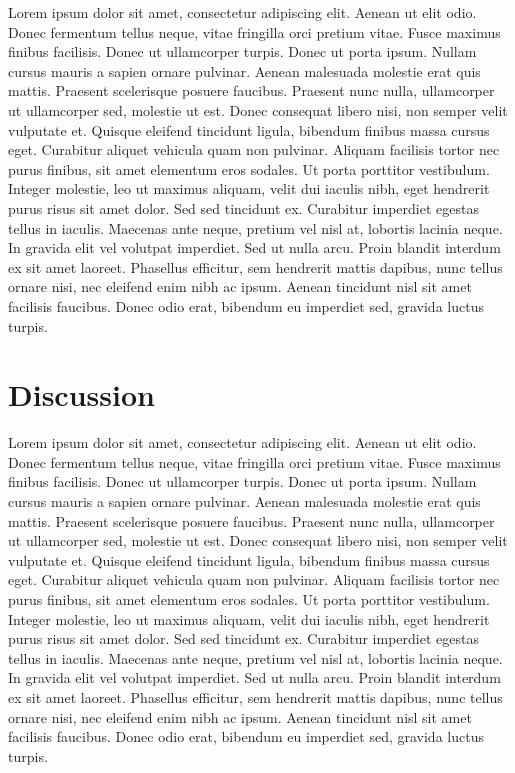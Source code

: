 \documentclass[utf8]{frontiersSCNS}
\begin{document}
Lorem ipsum dolor sit amet, consectetur adipiscing elit. Aenean ut elit
odio. Donec fermentum tellus neque, vitae fringilla orci pretium vitae.
Fusce maximus finibus facilisis. Donec ut ullamcorper turpis. Donec ut
porta ipsum. Nullam cursus mauris a sapien ornare pulvinar. Aenean
malesuada molestie erat quis mattis. Praesent scelerisque posuere
faucibus. Praesent nunc nulla, ullamcorper ut ullamcorper sed, molestie
ut est. Donec consequat libero nisi, non semper velit vulputate et.
Quisque eleifend tincidunt ligula, bibendum finibus massa cursus eget.
Curabitur aliquet vehicula quam non pulvinar. Aliquam facilisis tortor
nec purus finibus, sit amet elementum eros sodales. Ut porta porttitor
vestibulum. Integer molestie, leo ut maximus aliquam, velit dui iaculis
nibh, eget hendrerit purus risus sit amet dolor. Sed sed tincidunt ex.
Curabitur imperdiet egestas tellus in iaculis. Maecenas ante neque,
pretium vel nisl at, lobortis lacinia neque. In gravida elit vel
volutpat imperdiet. Sed ut nulla arcu. Proin blandit interdum ex sit
amet laoreet. Phasellus efficitur, sem hendrerit mattis dapibus, nunc
tellus ornare nisi, nec eleifend enim nibh ac ipsum. Aenean tincidunt
nisl sit amet facilisis faucibus. Donec odio erat, bibendum eu imperdiet
sed, gravida luctus turpis.

\hypertarget{discussion}{%
\section{Discussion}\label{discussion}}

Lorem ipsum dolor sit amet, consectetur adipiscing elit. Aenean ut elit
odio. Donec fermentum tellus neque, vitae fringilla orci pretium vitae.
Fusce maximus finibus facilisis. Donec ut ullamcorper turpis. Donec ut
porta ipsum. Nullam cursus mauris a sapien ornare pulvinar. Aenean
malesuada molestie erat quis mattis. Praesent scelerisque posuere
faucibus. Praesent nunc nulla, ullamcorper ut ullamcorper sed, molestie
ut est. Donec consequat libero nisi, non semper velit vulputate et.
Quisque eleifend tincidunt ligula, bibendum finibus massa cursus eget.
Curabitur aliquet vehicula quam non pulvinar. Aliquam facilisis tortor
nec purus finibus, sit amet elementum eros sodales. Ut porta porttitor
vestibulum. Integer molestie, leo ut maximus aliquam, velit dui iaculis
nibh, eget hendrerit purus risus sit amet dolor. Sed sed tincidunt ex.
Curabitur imperdiet egestas tellus in iaculis. Maecenas ante neque,
pretium vel nisl at, lobortis lacinia neque. In gravida elit vel
volutpat imperdiet. Sed ut nulla arcu. Proin blandit interdum ex sit
amet laoreet. Phasellus efficitur, sem hendrerit mattis dapibus, nunc
tellus ornare nisi, nec eleifend enim nibh ac ipsum. Aenean tincidunt
nisl sit amet facilisis faucibus. Donec odio erat, bibendum eu imperdiet
sed, gravida luctus turpis.
\end{document}
